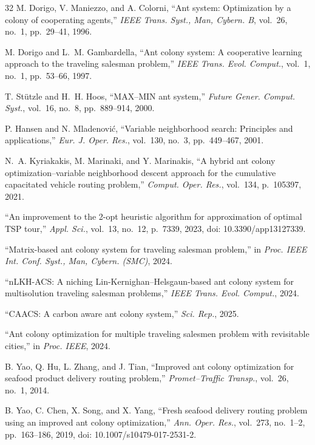 \documentclass[lettersize,journal]{IEEEtran}
\begin{document}
\begin{thebibliography}{32}
M. Dorigo, V. Maniezzo, and A. Colorni, ``Ant system: Optimization by a colony of cooperating agents,'' \textit{IEEE Trans. Syst., Man, Cybern. B}, vol.~26, no.~1, pp.~29--41, 1996.


M. Dorigo and L.~M. Gambardella, ``Ant colony system: A cooperative learning approach to the traveling salesman problem,'' \textit{IEEE Trans. Evol. Comput.}, vol.~1, no.~1, pp.~53--66, 1997.


T. St\"utzle and H.~H. Hoos, ``MAX--MIN ant system,'' \textit{Future Gener. Comput. Syst.}, vol.~16, no.~8, pp.~889--914, 2000.


P. Hansen and N. Mladenovi\'c, ``Variable neighborhood search: Principles and applications,'' \textit{Eur. J. Oper. Res.}, vol.~130, no.~3, pp.~449--467, 2001.


N.~A. Kyriakakis, M. Marinaki, and Y. Marinakis, ``A hybrid ant colony optimization--variable neighborhood descent approach for the cumulative capacitated vehicle routing problem,'' \textit{Comput. Oper. Res.}, vol.~134, p.~105397, 2021.


``An improvement to the 2-opt heuristic algorithm for approximation of optimal TSP tour,'' \textit{Appl. Sci.}, vol.~13, no.~12, p.~7339, 2023, doi: 10.3390/app13127339.


``Matrix-based ant colony system for traveling salesman problem,'' in \textit{Proc. IEEE Int. Conf. Syst., Man, Cybern. (SMC)}, 2024.


``nLKH-ACS: A niching Lin-Kernighan--Helsgaun-based ant colony system for multisolution traveling salesman problems,'' \textit{IEEE Trans. Evol. Comput.}, 2024.


``CAACS: A carbon aware ant colony system,'' \textit{Sci. Rep.}, 2025.


``Ant colony optimization for multiple traveling salesmen problem with revisitable cities,'' in \textit{Proc. IEEE}, 2024.


B. Yao, Q. Hu, L. Zhang, and J. Tian, ``Improved ant colony optimization for seafood product delivery routing problem,'' \textit{Promet--Traffic Transp.}, vol.~26, no.~1, 2014.


B. Yao, C. Chen, X. Song, and X. Yang, ``Fresh seafood delivery routing problem using an improved ant colony optimization,'' \textit{Ann. Oper. Res.}, vol.~273, no.~1--2, pp.~163--186, 2019, doi: 10.1007/s10479-017-2531-2.

\end{thebibliography}
\end{document}
